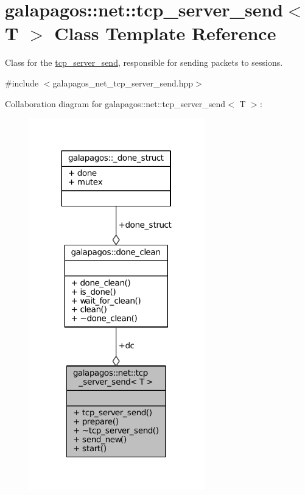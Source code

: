 \hypertarget{classgalapagos_1_1net_1_1tcp__server__send}{}\section{galapagos\+:\+:net\+:\+:tcp\+\_\+server\+\_\+send$<$ T $>$ Class Template Reference}
\label{classgalapagos_1_1net_1_1tcp__server__send}


Class for the \hyperlink{classgalapagos_1_1net_1_1tcp__server__send}{tcp\+\_\+server\+\_\+send}, responsible for sending packets to sessions.  




{\ttfamily \#include $<$galapagos\+\_\+net\+\_\+tcp\+\_\+server\+\_\+send.\+hpp$>$}



Collaboration diagram for galapagos\+:\+:net\+:\+:tcp\+\_\+server\+\_\+send$<$ T $>$\+:
\nopagebreak
\begin{figure}[H]
\begin{center}
\leavevmode
\includegraphics[width=216pt]{classgalapagos_1_1net_1_1tcp__server__send__coll__graph}
\end{center}
\end{figure}
